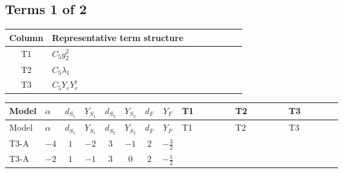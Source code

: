 \documentclass[8pt]{article}
\begin{document}
\begin{landscape}
\subsection*{Terms 1 of 2}
\begin{center}
\begin{tabular}{@{}c >{\raggedright\arraybackslash}p{0.82\linewidth}@{}}
\toprule
Column & Representative term structure \\
\midrule
T1 & \(\displaystyle C_{5} g_{2}^{2}\) \\
\midrule
T2 & \(\displaystyle C_{5} \lambda_1\) \\
\midrule
T3 & \(\displaystyle C_{5} Y_e Y_e^\dagger\) \\
\midrule
\bottomrule
\end{tabular}
\end{center}
\smallskip
\tiny
\begin{longtable}{@{}llcccccc >{\raggedright\arraybackslash}p{0.21\linewidth} >{\raggedright\arraybackslash}p{0.21\linewidth} >{\raggedright\arraybackslash}p{0.21\linewidth}@{}}
\toprule
Model & $\alpha$ & $d_{S_1}$ & $Y_{S_1}$ & $d_{S_2}$ & $Y_{S_2}$ & $d_F$ & $Y_F$ & T1 & T2 & T3 \\
\midrule
\endfirsthead
\toprule
Model & $\alpha$ & $d_{S_1}$ & $Y_{S_1}$ & $d_{S_2}$ & $Y_{S_2}$ & $d_F$ & $Y_F$ & T1 & T2 & T3 \\
\midrule
\endhead
T3-A & $-4$ & $1$ & $-2$ & $3$ & $-1$ & $2$ & $-\frac{3}{2}$ & \scriptsize\adjustbox{max width=\linewidth}{$\begin{gathered} - 3 C_{5} g_{2}^{2}\end{gathered}$} & \scriptsize\adjustbox{max width=\linewidth}{$\begin{gathered} 2 C_{5} \lambda_1\end{gathered}$} & \scriptsize\adjustbox{max width=\linewidth}{$\begin{gathered} - C_{5} Y_e Y_e^\dagger\end{gathered}$} \\
\midrule
T3-A & $-2$ & $1$ & $-1$ & $3$ & $0$ & $2$ & $-\frac{1}{2}$ & \scriptsize\adjustbox{max width=\linewidth}{$\begin{gathered} - 3 C_{5} g_{2}^{2}\end{gathered}$} & \scriptsize\adjustbox{max width=\linewidth}{$\begin{gathered} 2 C_{5} \lambda_1\end{gathered}$} & \scriptsize\adjustbox{max width=\linewidth}{$\begin{gathered} - C_{5} Y_e Y_e^\dagger\end{gathered}$} \\

\end{longtable}
\end{landscape}
\end{document}
